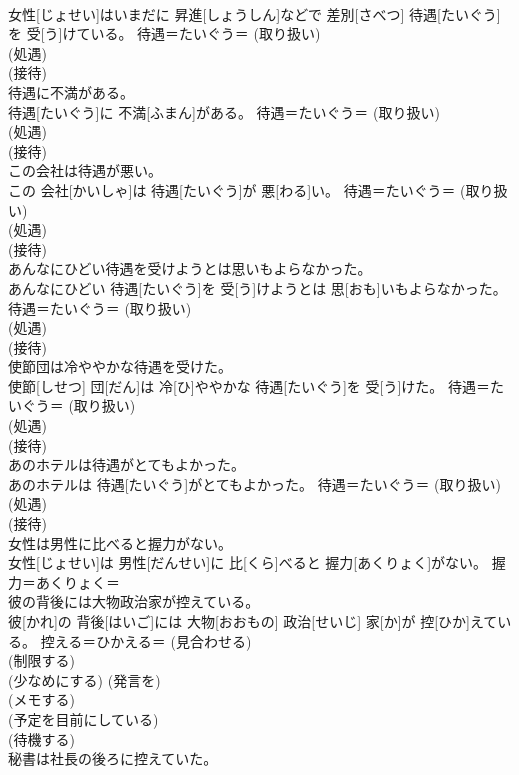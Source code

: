 \documentclass[8pt]{extreport}
\begin{document}
\begin{CJK}{UTF8}{min}
{\\	女性[じょせい]はいまだに 昇進[しょうしん]などで 差別[さべつ] 待遇[たいぐう]を 受[う]けている。	待遇＝たいぐう＝ (取り扱い) 
\\	(処遇) 
\\	(接待) 
\\	待遇に不満がある。	
\\	待遇[たいぐう]に 不満[ふまん]がある。	待遇＝たいぐう＝ (取り扱い) 
\\	(処遇) 
\\	(接待) 
\\	この会社は待遇が悪い。	
\\	この 会社[かいしゃ]は 待遇[たいぐう]が 悪[わる]い。	待遇＝たいぐう＝ (取り扱い) 
\\	(処遇) 
\\	(接待) 
\\	あんなにひどい待遇を受けようとは思いもよらなかった。	
\\	あんなにひどい 待遇[たいぐう]を 受[う]けようとは 思[おも]いもよらなかった。	待遇＝たいぐう＝ (取り扱い) 
\\	(処遇) 
\\	(接待) 
\\	使節団は冷ややかな待遇を受けた。	
\\	使節[しせつ] 団[だん]は 冷[ひ]ややかな 待遇[たいぐう]を 受[う]けた。	待遇＝たいぐう＝ (取り扱い) 
\\	(処遇) 
\\	(接待) 
\\	あのホテルは待遇がとてもよかった。	
\\	あのホテルは 待遇[たいぐう]がとてもよかった。	待遇＝たいぐう＝ (取り扱い) 
\\	(処遇) 
\\	(接待) 
\\	女性は男性に比べると握力がない。	
\\	女性[じょせい]は 男性[だんせい]に 比[くら]べると 握力[あくりょく]がない。	握力＝あくりょく＝ 
\\	彼の背後には大物政治家が控えている。	
\\	彼[かれ]の 背後[はいご]には 大物[おおもの] 政治[せいじ] 家[か]が 控[ひか]えている。	控える＝ひかえる＝ (見合わせる) 
\\	(制限する) 
\\	(少なめにする) (発言を) 
\\	(メモする) 
\\	(予定を目前にしている) 
\\	(待機する) 
\\	秘書は社長の後ろに控えていた。	
}
\end{CJK}
\end{document}
